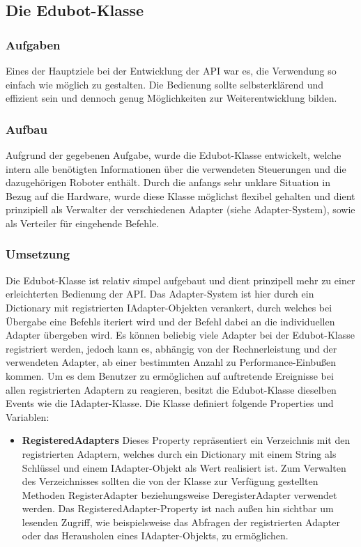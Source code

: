 
\subsection{Die Edubot-Klasse}

\subsubsection{Aufgaben}
Eines der Hauptziele bei der Entwicklung der API war es, die Verwendung so einfach wie möglich zu gestalten. Die Bedienung sollte selbsterklärend und effizient sein und dennoch genug Möglichkeiten zur Weiterentwicklung bilden.

\subsubsection{Aufbau}
Aufgrund der gegebenen Aufgabe, wurde die Edubot-Klasse entwickelt, welche intern alle benötigten Informationen über die verwendeten Steuerungen und die dazugehörigen Roboter enthält. Durch die anfangs sehr unklare Situation in Bezug auf die Hardware, wurde diese Klasse möglichst flexibel gehalten und dient prinzipiell als Verwalter der verschiedenen Adapter (siehe Adapter-System), sowie als Verteiler für eingehende Befehle.

\subsubsection{Umsetzung}

Die Edubot-Klasse ist relativ simpel aufgebaut und dient prinzipell mehr zu einer erleichterten Bedienung der API. Das Adapter-System ist hier durch ein Dictionary mit registrierten IAdapter-Objekten verankert, durch welches bei Übergabe eine Befehls iteriert wird und der Befehl dabei an die individuellen Adapter übergeben wird. Es können beliebig viele Adapter bei der Edubot-Klasse registriert werden, jedoch kann es, abhängig von der Rechnerleistung und der verwendeten Adapter, ab einer bestimmten Anzahl zu Performance-Einbußen kommen. Um es dem Benutzer zu ermöglichen auf auftretende Ereignisse bei allen registrierten Adaptern zu reagieren, besitzt die Edubot-Klasse dieselben Events wie die IAdapter-Klasse.
Die Klasse definiert folgende Properties und Variablen:
\begin{itemize}
\item \textbf{RegisteredAdapters}
\newline
Dieses Property repräsentiert ein Verzeichnis mit den registrierten Adaptern, welches durch ein Dictionary mit einem String als Schlüssel und einem IAdapter-Objekt als Wert realisiert ist. Zum Verwalten des Verzeichnisses sollten die von der Klasse zur Verfügung gestellten Methoden RegisterAdapter beziehungsweise DeregisterAdapter verwendet werden. Das RegisteredAdapter-Property ist nach außen hin sichtbar um lesenden Zugriff, wie beispielsweise das Abfragen der registrierten Adapter oder das Herausholen eines IAdapter-Objekts, zu ermöglichen. 
\end{itemize}


